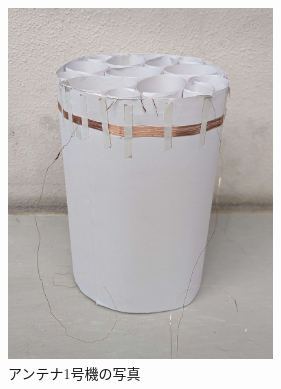 \documentclass[report.tex]{subfiles}
\begin{document}
\begin{figure}[H]
	\centering
	\includegraphics[width=7cm]{fig/1.jpg}
	\caption{アンテナ1号機の写真}
	\label{fig:1}
\end{figure}
\end{document}

